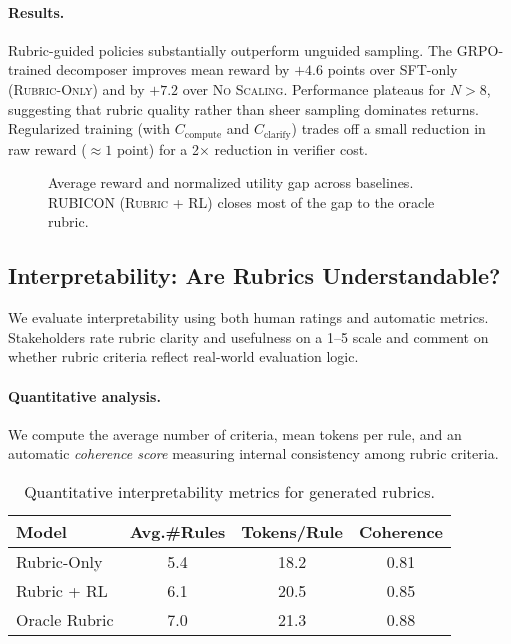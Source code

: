 \documentclass[sigconf]{acmart}
\begin{document}
\paragraph{Results.}
Rubric-guided policies substantially outperform unguided sampling.
The GRPO-trained decomposer improves mean reward by $+4.6$ points over SFT-only (\textsc{Rubric-Only}) and by $+7.2$ over \textsc{No Scaling}.
Performance plateaus for $N{>}8$, suggesting that rubric quality rather than sheer sampling dominates returns.
Regularized training (with $C_{\mathrm{compute}}$ and $C_{\mathrm{clarify}}$) trades off a small reduction in raw reward ($\approx\!1$ point) for a 2× reduction in verifier cost.

\begin{figure}[h]
\centering
{}
\caption{Average reward and normalized utility gap across baselines.
RUBICON (\textsc{Rubric + RL}) closes most of the gap to the oracle rubric.}
\label{fig:reward-gap}
\end{figure}

\subsection{Interpretability: Are Rubrics Understandable?}

We evaluate interpretability using both human ratings and automatic metrics.
Stakeholders rate rubric clarity and usefulness on a 1–5 scale
and comment on whether rubric criteria reflect real-world evaluation logic.

\paragraph{Quantitative analysis.}
We compute the average number of criteria, mean tokens per rule, and an automatic \emph{coherence score} measuring internal consistency among rubric criteria.

\begin{table}[h]
\centering
\caption{Quantitative interpretability metrics for generated rubrics.}
\begin{tabular}{lccc}
\toprule
Model & Avg.\#Rules & Tokens/Rule & Coherence \\
\midrule
Rubric-Only & 5.4 & 18.2 & 0.81 \\
Rubric + RL & 6.1 & 20.5 & 0.85 \\
Oracle Rubric & 7.0 & 21.3 & 0.88 \\
\bottomrule
\end{tabular}
\label{tab:interpretability}
\end{table}
\end{document}
